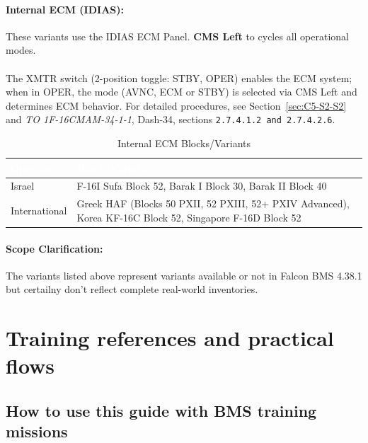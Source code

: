 \documentclass[11pt,a4paper]{article}
\providecommand{\dashrefs}[1]{\textit{TO 1F-16CMAM-34-1-1}, Dash-34, sections \texttt{#1}}
\begin{document}
\paragraph{Internal ECM (IDIAS):}
These variants use the IDIAS ECM Panel. \textbf{CMS Left} to cycles all operational modes.\\\\
The XMTR switch (2-position toggle: STBY, OPER) enables the ECM system; when in OPER, the mode (AVNC, ECM or STBY) is selected via CMS Left and determines ECM behavior. For detailed procedures, see Section~\ref{sec:C5-S2-S2} and \dashrefs{2.7.4.1.2 and 2.7.4.2.6}.
\begin{table}[h]
\centering
\caption{Internal ECM Blocks/Variants}
\label{tab:C5-S3-internal-ecm}
\small
\renewcommand{\arraystretch}{1.25}
\begin{tabular}{|>{\raggedright\arraybackslash}p{3.0cm}|>{\raggedright\arraybackslash}p{5.8cm}|}
\hline
\rowcolor{headerblue}
\textcolor{white}{\textbf{Operator}} & \textcolor{white}{\textbf{Block/Variant}} \\
\hline
Israel & F-16I Sufa Block 52, Barak I Block 30, Barak II Block 40 \\
\hline
International & Greek HAF (Blocks 50 PXII, 52 PXIII, 52+ PXIV Advanced), Korea KF-16C Block 52, Singapore F-16D Block 52 \\
\hline
\end{tabular}
\end{table}

\paragraph{Scope Clarification:}

The variants listed above represent variants available or not in Falcon BMS 4.38.1 but certailny don't reflect complete real-world inventories.

\newpage
\section{Training references and practical flows}
\subsection{How to use this guide with BMS training missions}
\end{document}
